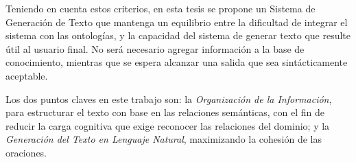 Teniendo en cuenta estos criterios, en esta tesis se propone un Sistema de Generación de Texto que mantenga un equilibrio entre la dificultad de integrar el sistema con las ontologías, y la capacidad del sistema de generar texto que resulte útil al usuario final. No será necesario agregar información a la base de conocimiento, mientras que se espera alcanzar una salida que sea sintácticamente aceptable.

Los dos puntos claves en este trabajo son: la \textit{Organización de la Información}, para estructurar el texto con base en las relaciones semánticas, con el fin de reducir la carga cognitiva que exige reconocer las relaciones del dominio; y la \textit{Generación del Texto en Lenguaje Natural}, maximizando la cohesión de las oraciones.

\vfill
\pagebreak
